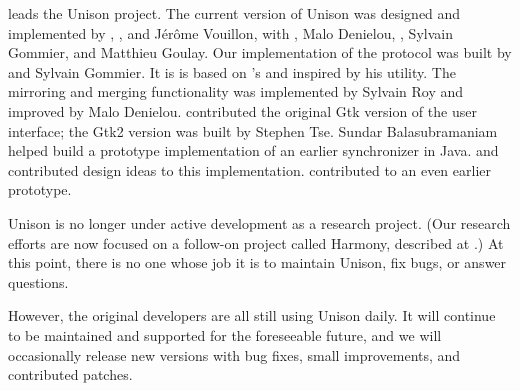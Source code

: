 \documentclass{article}
\begin{document}


 leads the
Unison project.   
%
The current version of Unison was designed and implemented by
    ,
    ,
and
    J\'{e}r\^{o}me Vouillon,
with
    ,
    {Malo Denielou},
    ,
    Sylvain Gommier, and
    Matthieu Goulay.
%
Our implementation of the
  protocol was built by
  and Sylvain Gommier.  It is is based on
  's
  and inspired by his
  utility.
%
The mirroring and merging functionality was implemented by
  Sylvain Roy and improved by Malo Denielou.
%
 contributed the original Gtk version of the user
  interface; the Gtk2 version was built by Stephen Tse. 
%
 Sundar Balasubramaniam helped build a prototype implementation of
an earlier synchronizer in Java.
and
 contributed design
ideas to this implementation.
contributed to an even earlier prototype.





Unison is no longer under active development as a research
project.  (Our research efforts  are now focused on a follow-on
project called Harmony, described at
.) 
At this point, there is no one whose job it is to maintain Unison,
fix bugs, or answer questions.

However, the original developers are all still using Unison daily.  It
will continue to be maintained and supported for the foreseeable future,
and we will occasionally release new versions with bug fixes, small
improvements, and contributed patches.
\end{document}
